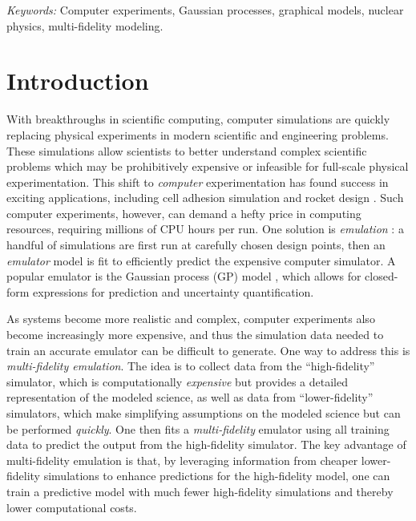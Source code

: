 \documentclass[12pt]{article}
\begin{document}
\noindent%
{\it Keywords:} Computer experiments, Gaussian processes, graphical models, nuclear physics, multi-fidelity modeling.
\vfill

\newpage
{} %
\section{Introduction}
\label{sec:introduction}

With breakthroughs in scientific computing, computer simulations are quickly replacing physical experiments in modern scientific and engineering problems. These simulations allow scientists to better understand complex scientific problems which may be prohibitively expensive or infeasible for full-scale physical experimentation. This shift to \textit{computer} experimentation has found success in exciting applications, including cell adhesion simulation \citep{sung2020calibration} and rocket design \citep{mak2018efficient}. Such computer experiments, however, can demand a hefty price in computing resources, requiring millions of CPU hours per run. One solution is \textit{emulation} \citep{santner2019design,gramacy2020surrogates}: a handful of simulations are first run at carefully chosen design points, then an \textit{emulator} model is fit to efficiently predict the expensive computer simulator. A popular emulator is the Gaussian process (GP) model \citep{gramacy2020surrogates}, which allows for closed-form expressions for prediction and uncertainty quantification.

As systems become more realistic and complex, computer experiments also become increasingly more expensive, and thus the simulation data needed to train an accurate emulator can be difficult to generate. One way to address this is \textit{multi-fidelity emulation}. The idea is to collect data from the ``high-fidelity'' simulator, which is computationally \textit{expensive} but provides a detailed representation of the modeled science, as well as data from ``lower-fidelity'' simulators, which make simplifying assumptions on the modeled science but can be performed \textit{quickly}. One then fits a \textit{multi-fidelity} emulator using all training data to predict the output from the high-fidelity simulator. The key advantage of multi-fidelity emulation is that, by leveraging information from cheaper lower-fidelity simulations to enhance predictions for the high-fidelity model, one can train a predictive model with much fewer high-fidelity simulations and thereby lower computational costs.
\end{document}
